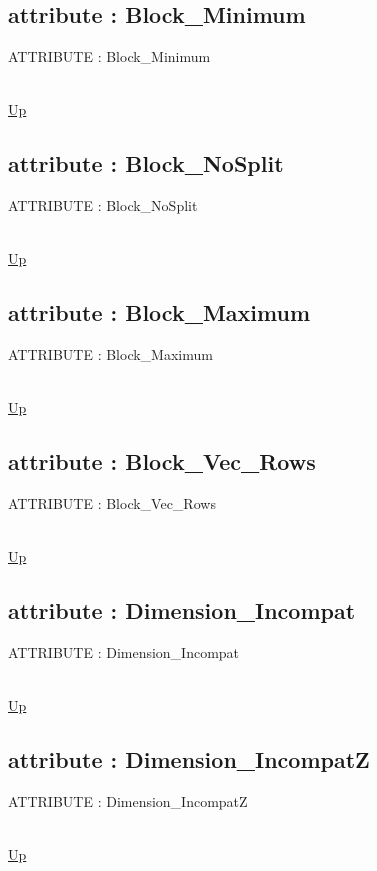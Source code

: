 \subsection*{attribute : Block\_Minimum}
\hypertarget{ecldoc:pbblas.constants.block_minimum}{ATTRIBUTE : Block\_Minimum} \\
\hyperlink{ecldoc:PBblas.Constants}{Up} \\
\par
\subsection*{attribute : Block\_NoSplit}
\hypertarget{ecldoc:pbblas.constants.block_nosplit}{ATTRIBUTE : Block\_NoSplit} \\
\hyperlink{ecldoc:PBblas.Constants}{Up} \\
\par
\subsection*{attribute : Block\_Maximum}
\hypertarget{ecldoc:pbblas.constants.block_maximum}{ATTRIBUTE : Block\_Maximum} \\
\hyperlink{ecldoc:PBblas.Constants}{Up} \\
\par
\subsection*{attribute : Block\_Vec\_Rows}
\hypertarget{ecldoc:pbblas.constants.block_vec_rows}{ATTRIBUTE : Block\_Vec\_Rows} \\
\hyperlink{ecldoc:PBblas.Constants}{Up} \\
\par
\subsection*{attribute : Dimension\_Incompat}
\hypertarget{ecldoc:pbblas.constants.dimension_incompat}{ATTRIBUTE : Dimension\_Incompat} \\
\hyperlink{ecldoc:PBblas.Constants}{Up} \\
\par
\subsection*{attribute : Dimension\_IncompatZ}
\hypertarget{ecldoc:pbblas.constants.dimension_incompatz}{ATTRIBUTE : Dimension\_IncompatZ} \\
\hyperlink{ecldoc:PBblas.Constants}{Up} \\
\par
